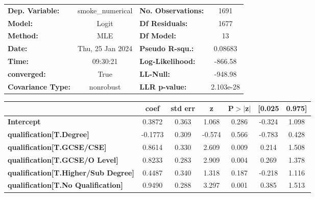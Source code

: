 \begin{center}
\begin{tabular}{lclc}
\toprule
\textbf{Dep. Variable:}                     & smoke\_numerical & \textbf{  No. Observations:  } &     1691    \\
\textbf{Model:}                             &      Logit       & \textbf{  Df Residuals:      } &     1677    \\
\textbf{Method:}                            &       MLE        & \textbf{  Df Model:          } &       13    \\
\textbf{Date:}                              & Thu, 25 Jan 2024 & \textbf{  Pseudo R-squ.:     } &  0.08683    \\
\textbf{Time:}                              &     09:30:21     & \textbf{  Log-Likelihood:    } &   -866.58   \\
\textbf{converged:}                         &       True       & \textbf{  LL-Null:           } &   -948.98   \\
\textbf{Covariance Type:}                   &    nonrobust     & \textbf{  LLR p-value:       } & 2.103e-28   \\
\bottomrule
\end{tabular}
\begin{tabular}{lcccccc}
                                            & \textbf{coef} & \textbf{std err} & \textbf{z} & \textbf{P$> |$z$|$} & \textbf{[0.025} & \textbf{0.975]}  \\
\midrule
\textbf{Intercept}                          &       0.3872  &        0.363     &     1.068  &         0.286        &       -0.324    &        1.098     \\
\textbf{qualification[T.Degree]}            &      -0.1773  &        0.309     &    -0.574  &         0.566        &       -0.783    &        0.428     \\
\textbf{qualification[T.GCSE/CSE]}          &       0.8614  &        0.330     &     2.609  &         0.009        &        0.214    &        1.508     \\
\textbf{qualification[T.GCSE/O Level]}      &       0.8233  &        0.283     &     2.909  &         0.004        &        0.269    &        1.378     \\
\textbf{qualification[T.Higher/Sub Degree]} &       0.4487  &        0.340     &     1.318  &         0.187        &       -0.218    &        1.116     \\
\textbf{qualification[T.No Qualification]}  &       0.9490  &        0.288     &     3.297  &         0.001        &        0.385    &        1.513     \\

\end{tabular}
\end{center}
